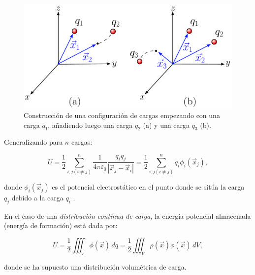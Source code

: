 \begin{figure}[H]
    \centering
    \includegraphics[scale = 0.65]{Figuras/Energia-Potencial.pdf}
    \caption{Construcción de una configuración de cargas empezando con una carga $q_1$, añadiendo luego una carga $q_2$ (a) y una carga $q_3$ (b).}
    \label{fig:Energía-Potencial}
\end{figure}

Generalizando para $n$ cargas:
\begin{shaded}
  $$U = \frac{1}{2} \sum_{i,j (i\neq j)}^n \frac{1}{4\pi \varepsilon_0} \frac{q_i q_j}{|\Vec{x}_j - \Vec{x}_i|} = \frac{1}{2} \sum_{i,j (i\neq j)}^n q_i \phi_i(\Vec{x}_j),$$ 
\end{shaded}

donde  $\phi_i(\Vec{x}_j)$ es el potencial electrostático en el punto donde se sitúa la carga $q_j$ debido a la carga $q_i$ .

En el caso de una \textit{distribución continua de carga}, la energía potencial almacenada (energía de formación) está dada por:
\begin{shaded}
   $$ U = \frac{1}{2} \iiint_{V} \phi(\Vec{x}) \,dq = \frac{1}{2} \iiint_{V} \rho(\Vec{x}) \phi(\Vec{x}) \,dV, $$
\end{shaded}

donde se ha supuesto una distribución volumétrica de carga.

